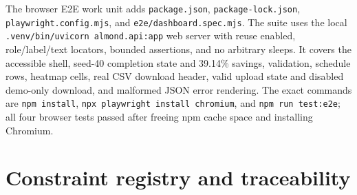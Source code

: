 \documentclass[11pt,a4paper]{article}
\begin{document}
The browser E2E work unit adds \texttt{package.json}, \texttt{package-lock.json}, \texttt{playwright.config.mjs}, and \texttt{e2e/dashboard.spec.mjs}. The suite uses the local \texttt{.venv/bin/uvicorn almond.api:app} web server with reuse enabled, role/label/text locators, bounded assertions, and no arbitrary sleeps. It covers the accessible shell, seed-40 completion state and 39.14\% savings, validation, schedule rows, heatmap cells, real CSV download header, valid upload state and disabled demo-only download, and malformed JSON error rendering. The exact commands are \texttt{npm install}, \texttt{npx playwright install chromium}, and \texttt{npm run test:e2e}; all four browser tests passed after freeing npm cache space and installing Chromium.

\section{Constraint registry and traceability}
\end{document}

